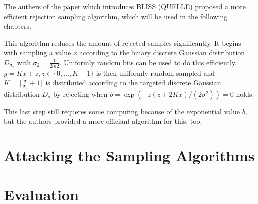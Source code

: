 The authers of the paper which introduces BLISS (QUELLE) proposed a more efficient rejection sampling algorithm, which will be used in the following chapters.%

This algorithm reduces the amount of rejected samples significantly. It begins with sampling a value $x$ according to the binary discrete Gaussian distribution $D_{\sigma 	_{2}}$ with $\sigma _2 = \frac{1}{2 ln 2}$. Uniformly random bits can be used to do this efficiently. $y = Kx + z, z \in \{0,...,K-1\}$ is then uniformly random sampled and $K = \lfloor\frac{\sigma}{\sigma _2} + 1\rfloor$ is distributed according to the targeted discrete Gaussian distribution $D_\sigma$ by rejecting when $b = \exp (−z(z + 2Kx)/(2σ^2)) = 0$ holds.

This last step still requeres some computing because of the exponential value $b$, but the authors provided a more efficiant algorithm for this, too. %



\section{Attacking the Sampling Algorithms}

\section{Evaluation}